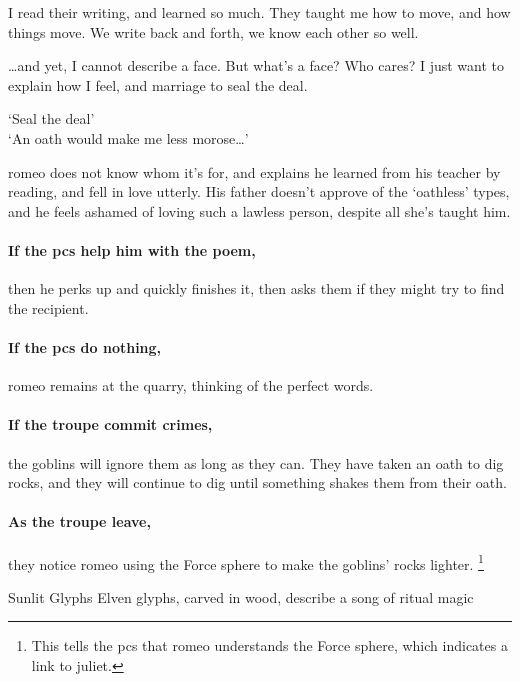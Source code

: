 \begin{multicols}{2}
\begin{speechtext}
  I read their writing, and learned so much.
  They taught me how to move, and how things move.
  We write back and forth, we know each other so well.

  \ldots and yet, I cannot describe a face.
  But what's a face?
  Who cares?
  I just want to explain how I feel, and marriage to seal the deal.

  `Seal the deal'\\
  `An oath would make me less morose\ldots'

\end{speechtext}

\Gls{romeo} does not know whom it's for, and explains he learned from his teacher by reading, and fell in love utterly.
His father doesn't approve of the `oathless' types, and he feels ashamed of loving such a lawless person, despite all she's taught him.

\paragraph{If the \glspl{pc} help him with the poem,}
then he perks up and quickly finishes it, then asks them if they might try to find the recipient.

\paragraph{If the \glspl{pc} do nothing,}
\gls{romeo} remains at the quarry, thinking of the perfect words.

\paragraph{If the troupe commit crimes,}
the goblins will ignore them as long as they can.
They have taken an oath to dig rocks, and they will continue to dig until something shakes them from their oath.

\romeo

\showStdSpells

\paragraph{As the troupe leave,}
they notice \gls{romeo} using the Force \gls{sphere} to make the goblins' rocks lighter.%
\footnote{This tells the \glspl{pc} that \gls{romeo} understands the Force \gls{sphere}, which indicates a link to \gls{juliet}.}

{Sunlit Glyphs}%
{Elven glyphs, carved in wood, describe a song of ritual magic}%
\label{sunwayGlyphs}


\end{multicols}
